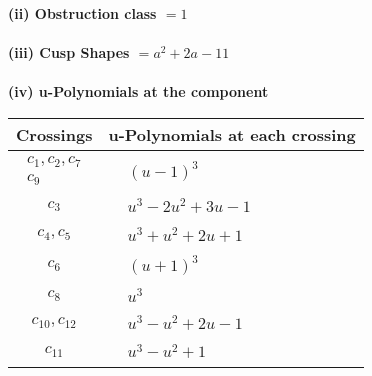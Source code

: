 \documentclass[1p]{elsarticle_modified}
\theoremstyle{definition}
\begin{document}
\flushleft \textbf{(ii) Obstruction class $= 1$}\\~\\
\flushleft \textbf{(iii) Cusp Shapes $= a^2+2 a-11$}\\~\\
\newpage\renewcommand{\arraystretch}{1}
\flushleft \textbf{(iv) u-Polynomials at the component}\newline \\
\begin{tabular}{m{50pt}|m{274pt}}
Crossings & \hspace{64pt}u-Polynomials at each crossing \\
\hline $$\begin{aligned}c_{1},c_{2},c_{7}\\c_{9}\end{aligned}$$&$\begin{aligned}
&(u-1)^3
\end{aligned}$\\
\hline $$\begin{aligned}c_{3}\end{aligned}$$&$\begin{aligned}
&u^3-2 u^2+3 u-1
\end{aligned}$\\
\hline $$\begin{aligned}c_{4},c_{5}\end{aligned}$$&$\begin{aligned}
&u^3+u^2+2 u+1
\end{aligned}$\\
\hline $$\begin{aligned}c_{6}\end{aligned}$$&$\begin{aligned}
&(u+1)^3
\end{aligned}$\\
\hline $$\begin{aligned}c_{8}\end{aligned}$$&$\begin{aligned}
&u^3
\end{aligned}$\\
\hline $$\begin{aligned}c_{10},c_{12}\end{aligned}$$&$\begin{aligned}
&u^3- u^2+2 u-1
\end{aligned}$\\
\hline $$\begin{aligned}c_{11}\end{aligned}$$&$\begin{aligned}
&u^3- u^2+1
\end{aligned}$\\
\hline
\end{tabular}\\~\\
\end{document}
